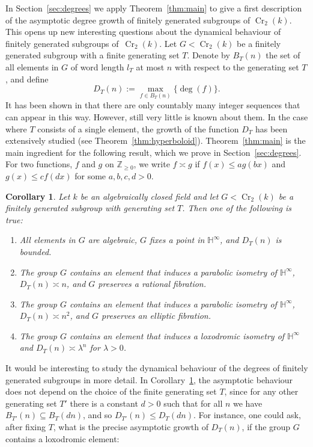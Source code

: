 \documentclass[JEP,XML,SOM,Unicode, NoEqCountersInSection,published]{cedram}
\newcommand{\h}{\operatorname{\mathbb{H}^{\infty}}}
\newcommand{\N}{\operatorname{\mathbb{Z}_{\geq 0}}}
\newcommand{\kk}{k}
\newcommand{\Cr}{\operatorname{Cr}}
\theoremstyle{plain}
\newtheorem{corollary}[theorem]{Corollary}
\theoremstyle{definition}
\begin{document}
In Section~\ref{sec:degrees} we apply Theorem~\ref{thm:main} to give a first description of the asymptotic degree growth of finitely generated subgroups of $\Cr_2(k)$. This opens up new interesting questions about the dynamical behaviour of finitely generated subgroups of~$\Cr_2(k)$. Let $G<\Cr_2(k)$ be a finitely generated subgroup with a finite generating set $T$. Denote by $B_T(n)$ the set of all elements in $G$ of word length $l_T$ at most $n$ with respect to the generating set $T$, and define
\[
D_{T}(n):=\max_{f\in B_T(n)}\{\deg(f)\}.
\]
It has been shown in \cite{MR3818624} that there are only countably many integer sequences that can appear in this way. However, still very little is known about them. In the case where $T$ consists of a single element, the growth of the function $D_T$ has been {extensively} studied (see Theorem~\ref{thm:hyperboloid}). Theorem~\ref{thm:main} is the main ingredient for the following result, which we prove in Section~\ref{sec:degrees}. For two functions, $f$ and $g$ on $\N$, we write $f\asymp g$ if $f(x)\leq ag(bx)$ and $g(x)\leq cf(dx)$ for some $a,b,c,d>0$.
\begin{corollary}\label{cor:degree}
Let $\kk$ be an algebraically closed field and let $G<\Cr_2(k)$ be a finitely generated subgroup with generating set $T$. Then one of the following is true:
\begin{enumerate}
\item All elements in $G$ are algebraic, $G$ fixes a point in $\h$, and $D_T(n)$ is bounded.
\item[(2a)] The group $G$ contains an element that induces a parabolic isometry of $\h$, $D_T(n)\asymp n$, and $G$ preserves a rational fibration.
\item[(2b)] The group $G$ contains an element that induces a parabolic isometry of $\h$, $D_T(n)\asymp n^2$, and $G$ preserves an elliptic fibration.
\item[(3)] The group $G$ contains an element that induces a loxodromic isometry of $\h$ and $D_T(n)\asymp\lambda^n$ for $\lambda>0$.
\end{enumerate}
\end{corollary}

It would be interesting to study the dynamical behaviour of the degrees of finitely generated subgroups in more detail. In Corollary~\ref{cor:degree}, the asymptotic behaviour does not depend on the choice of the finite generating set $T$, {since for any other generating set $T'$ there is a constant $d>0$ such that for all $n$ we have $B_{T'}(n)\subseteq B_T(dn)$, and so $D_{T'}(n)\leq D_{T}(dn)$.} For instance, one could ask, after fixing $T$, what is the precise asymptotic growth of $D_T(n)$, if the group $G$ contains a loxodromic element:
\end{document}
